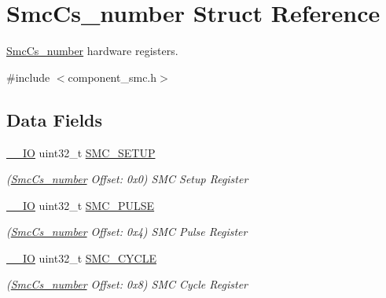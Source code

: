 \hypertarget{structSmcCs__number}{}\section{Smc\+Cs\+\_\+number Struct Reference}
\label{structSmcCs__number}


\mbox{\hyperlink{structSmcCs__number}{Smc\+Cs\+\_\+number}} hardware registers.  




{\ttfamily \#include $<$component\+\_\+smc.\+h$>$}

\subsection*{Data Fields}
\begin{DoxyCompactItemize}
\item 
\mbox{\label{structSmcCs__number_a4357a8090da91516ab58baa891547485}} 
\mbox{\hyperlink{core__cm7_8h_aec43007d9998a0a0e01faede4133d6be}{\+\_\+\+\_\+\+IO}} uint32\+\_\+t \mbox{\hyperlink{structSmcCs__number_a4357a8090da91516ab58baa891547485}{S\+M\+C\+\_\+\+S\+E\+T\+UP}}
\begin{DoxyCompactList}\small\item\em (\mbox{\hyperlink{structSmcCs__number}{Smc\+Cs\+\_\+number}} Offset\+: 0x0) S\+MC Setup Register \end{DoxyCompactList}\item 
\mbox{\label{structSmcCs__number_af67a89be9275ad71ad3c5a380e8971b5}} 
\mbox{\hyperlink{core__cm7_8h_aec43007d9998a0a0e01faede4133d6be}{\+\_\+\+\_\+\+IO}} uint32\+\_\+t \mbox{\hyperlink{structSmcCs__number_af67a89be9275ad71ad3c5a380e8971b5}{S\+M\+C\+\_\+\+P\+U\+L\+SE}}
\begin{DoxyCompactList}\small\item\em (\mbox{\hyperlink{structSmcCs__number}{Smc\+Cs\+\_\+number}} Offset\+: 0x4) S\+MC Pulse Register \end{DoxyCompactList}\item 
\mbox{\label{structSmcCs__number_a42516353dc8e3b13854b36d1a5ac017a}} 
\mbox{\hyperlink{core__cm7_8h_aec43007d9998a0a0e01faede4133d6be}{\+\_\+\+\_\+\+IO}} uint32\+\_\+t \mbox{\hyperlink{structSmcCs__number_a42516353dc8e3b13854b36d1a5ac017a}{S\+M\+C\+\_\+\+C\+Y\+C\+LE}}
\begin{DoxyCompactList}\small\item\em (\mbox{\hyperlink{structSmcCs__number}{Smc\+Cs\+\_\+number}} Offset\+: 0x8) S\+MC Cycle Register \end{DoxyCompactList}\item 

\end{DoxyCompactItemize}
